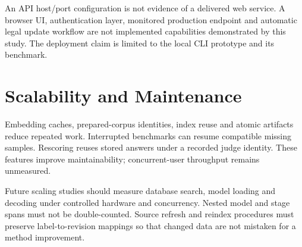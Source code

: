 An API host/port configuration is not evidence of a delivered web service. A browser UI, authentication layer, monitored production endpoint and automatic legal update workflow are not implemented capabilities demonstrated by this study. The deployment claim is limited to the local CLI prototype and its benchmark.

\section{Scalability and Maintenance}
Embedding caches, prepared-corpus identities, index reuse and atomic artifacts reduce repeated work. Interrupted benchmarks can resume compatible missing samples. Rescoring reuses stored answers under a recorded judge identity. These features improve maintainability; concurrent-user throughput remains unmeasured.

Future scaling studies should measure database search, model loading and decoding under controlled hardware and concurrency. Nested model and stage spans must not be double-counted. Source refresh and reindex procedures must preserve label-to-revision mappings so that changed data are not mistaken for a method improvement.
